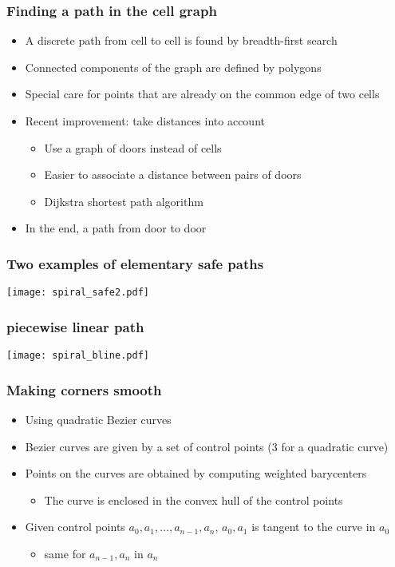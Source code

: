 \documentclass[compress]{beamer}
\begin{document}
\begin{frame}
\frametitle{Finding a path in the cell graph}
\begin{itemize}
\item A discrete path from cell to cell is found by breadth-first search
\item Connected components of the graph are defined by polygons
\item Special care for points that are already on the common edge of two cells
\item Recent improvement: take distances into account
\begin{itemize}
\item Use a graph of doors instead of cells
\item Easier to associate a distance between pairs of doors
\item Dijkstra shortest path algorithm
\end{itemize}
\item In the end, a path from door to door
\end{itemize}
\end{frame}
\begin{frame}
\frametitle{Two examples of elementary safe paths}
\texttt{[image: spiral\_safe2.pdf]}
\end{frame}
\begin{frame}
\frametitle{piecewise linear path}
\label{broken-line}
\texttt{[image: spiral\_bline.pdf]}
\end{frame}
\begin{frame}
\frametitle{Making corners smooth}
\begin{itemize}
\item Using quadratic Bezier curves
\item Bezier curves are given by a set of control points
   (3 for a quadratic curve)
\item Points on the curves are obtained by computing weighted barycenters
\begin{itemize}
\item The curve is enclosed in the convex hull of the control points
\end{itemize}
\item Given control points \(a_0, a_1, \ldots, a_{n-1}, a_n\), \(a_0, a_1\)
is tangent to the curve in \(a_0\)
\begin{itemize}
\item same for \(a_{n-1}, a_n\) in \(a_n\)
\end{itemize}
\end{itemize}
\end{frame}
\end{document}
